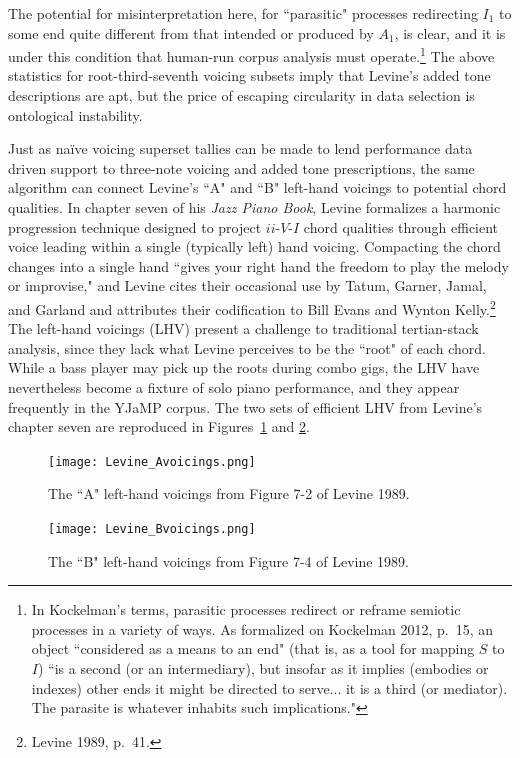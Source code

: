 The potential for misinterpretation here, for ``parasitic" processes redirecting $I_1$ to some end quite different from that intended or produced by $A_1$, is clear, and it is under this condition that human-run corpus analysis must operate.\footnote{In Kockelman's terms, parasitic processes redirect or reframe semiotic processes in a variety of ways.  As formalized on Kockelman 2012, p.\ 15, an object ``considered as a means to an end" (that is, as a tool for mapping $S$ to $I$) ``is a second (or an intermediary), but insofar as it implies (embodies or indexes) other ends it might be directed to serve... it is a third (or mediator).  The parasite is whatever inhabits such implications."}  The above statistics for root-third-seventh voicing subsets imply that Levine's added tone descriptions are apt, but the price of escaping circularity in data selection is ontological instability.

Just as na\"{i}ve voicing superset tallies can be made to lend performance data driven support to three-note voicing and added tone prescriptions, the same algorithm can connect Levine's ``A" and ``B" left-hand voicings to potential chord qualities.  In chapter seven of his \emph{Jazz Piano Book}, Levine formalizes a harmonic progression technique designed to project $ii$-$V$-$I$ chord qualities through efficient voice leading within a single (typically left) hand voicing.  Compacting the chord changes into a single hand ``gives your right hand the freedom to play the melody or improvise," and Levine cites their occasional use by Tatum, Garner, Jamal, and Garland and attributes their codification to Bill Evans and Wynton Kelly.\footnote{Levine 1989, p.\ 41.}  The left-hand voicings (LHV) present a challenge to traditional tertian-stack analysis, since they lack what Levine perceives to be the ``root" of each chord.  While a bass player may pick up the roots during combo gigs, the LHV have nevertheless become a fixture of solo piano performance, and they appear frequently in the YJaMP corpus.  The two sets of efficient LHV from Levine's chapter seven are reproduced in Figures~\ref{levine_Avcg} and \ref{levine_Bvcg}.

\begin{figure}[h]
	\centering
	\texttt{[image: Levine\_Avoicings.png]}
	\caption{The ``A" left-hand voicings from Figure 7-2 of Levine 1989.}
	\label{levine_Avcg}
\end{figure}
\begin{figure}[h]
	\centering
	\texttt{[image: Levine\_Bvoicings.png]}
	\caption{The ``B" left-hand voicings from Figure 7-4 of Levine 1989.}
	\label{levine_Bvcg}
\end{figure}

